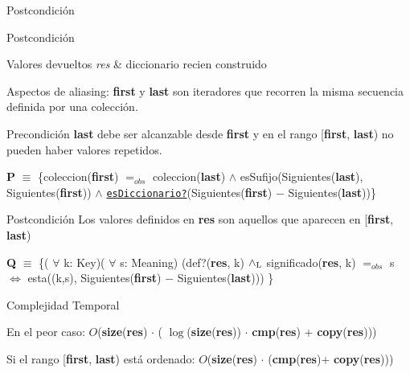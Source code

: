 \begin{DoxyPostcond}{\-Postcondición}
\begin{DoxyPostcond}{\-Postcondición}
\begin{DoxyRetVals}{Valores devueltos}
{\em res} & diccionario recien construido\\
\hline
\end{DoxyRetVals}
\begin{DoxyParagraph}{Aspectos de aliasing\+:}
{\bfseries first} y {\bfseries last} son iteradores que recorren la misma secuencia definida por una colección.
\end{DoxyParagraph}
\begin{DoxyPrecond}{Precondición}
{\bfseries last} debe ser alcanzable desde {\bfseries first} y en el rango \mbox{[}{\bfseries first}, {\bfseries last}) no pueden haber valores repetidos.

{\bfseries P} $\equiv$ \{coleccion({\bfseries first}) $=_{obs}$ coleccion({\bfseries last}) $\land$ es\+Sufijo(Siguientes({\bfseries last}), Siguientes({\bfseries first})) $\land$ \href{axiomas.html#esDiccionario?}{\tt es\+Diccionario?}(Siguientes({\bfseries first}) $-$ Siguientes({\bfseries last}))\} 
\end{DoxyPrecond}


\begin{DoxyPostcond}{Postcondición}
Los valores definidos en {\bfseries res} son aquellos que aparecen en \mbox{[}{\bfseries first}, {\bfseries last})

{\bfseries Q} $\equiv$ \{( $\forall$ k\+: Key)( $\forall$ s\+: Meaning) (def?({\bfseries res}, k) $\land_{\rm L}$ significado({\bfseries res}, k) $=_{obs}$ s $\Leftrightarrow$ esta((k,s), Siguientes({\bfseries first}) $-$ Siguientes({\bfseries last}))) \} 
\end{DoxyPostcond}



\begin{DoxyDescription}
\item[Complejidad Temporal]
\begin{DoxyItemize}
\item En el peor caso\+: $O$({\bfseries size}({\bfseries res}) $\cdot$ ( $\log$({\bfseries size}({\bfseries res})) $\cdot$ {\bfseries cmp}({\bfseries res}) + {\bfseries copy}({\bfseries res})))
\item Si el rango \mbox{[}{\bfseries first}, {\bfseries last}) está ordenado\+: $O$({\bfseries size}({\bfseries res}) $\cdot$ ({\bfseries cmp}({\bfseries res})+ {\bfseries copy}({\bfseries res}))) 
\end{DoxyItemize}
\end{DoxyDescription}


\end{DoxyPostcond}
\end{DoxyPostcond}
